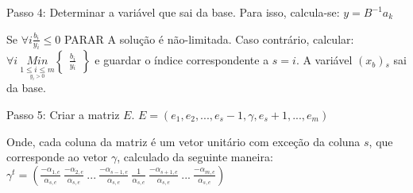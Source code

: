 Passo 4: Determinar a variável que sai da base. Para isso, calcula-se: $y=B^{-1}a{_k}$

Se $\forall i\frac{b{_i}}{y{_i}}\leq 0$ PARAR A solução é não-limitada. Caso contrário, calcular:
$\forall i\ \underset{\underset{y{_i}>0}{1\leq i\leq m}}{Min}\begin{Bmatrix}
\frac{b{_i}}{y{_i}}
\end{Bmatrix}$ e guardar o índice correspondente a $s = i$. A variável $(x{_b}){_s}$ sai da base.

Passo 5: Criar a matriz $E$.
$E=(e{_1},e{_2},...,e{_s-1},\gamma , e{_s+1},...,e{_m})$

Onde, cada coluna da matriz é um vetor unitário com exceção da coluna $s$, que corresponde ao vetor $\gamma$, calculado da seguinte maneira:
$\gamma^{t}=\left( \frac{-\alpha {_{1,e}}}{\alpha {_{s,e}}}\ \frac{-\alpha {_{2,e}}}{\alpha {_{s,e}}}\ ...\ \frac{-\alpha {_{s-1,e}}}{\alpha {_{s,e}}}\ \frac{1}{\alpha {_{s,e}}}\ \frac{-\alpha {_{s+1,e}}}{\alpha {_{s,e}}}\ ...\ \frac{-\alpha {_{m,e}}}{\alpha {_{s,e}}} \right )$
